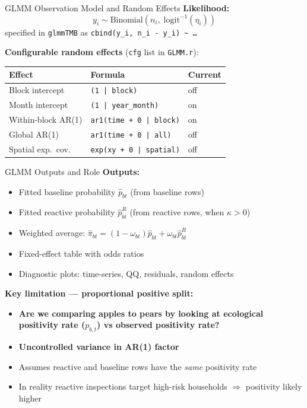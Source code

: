 \documentclass[aspectratio=169]{beamer}
\begin{document}
\begin{frame}{GLMM Observation Model and Random Effects}
  \textbf{Likelihood:}
  \begin{equation*}
    y_i \sim \text{Binomial}(n_i,\; \text{logit}^{-1}(\eta_i))
  \end{equation*}
  specified in \texttt{glmmTMB} as \texttt{cbind(y\_i, n\_i - y\_i) \textasciitilde\ \ldots}

  \vspace{0.5cm}
  \textbf{Configurable random effects} (\texttt{cfg} list in \texttt{GLMM.r}):
  \begin{center}
  \small
  \begin{tabular}{lll}
    \hline
    \textbf{Effect} & \textbf{Formula} & \textbf{Current} \\
    \hline
    Block intercept & \texttt{(1 | block)} & off \\
    Month intercept & \texttt{(1 | year\_month)} & on \\
    Within-block AR(1) & \texttt{ar1(time + 0 | block)} & on \\
    Global AR(1) & \texttt{ar1(time + 0 | all)} & off \\
    Spatial exp.\ cov. & \texttt{exp(xy + 0 | spatial)} & off \\
    \hline
  \end{tabular}
  \end{center}
\end{frame}

\begin{frame}{GLMM Outputs and Role}
  \textbf{Outputs:}
  \begin{itemize}
    \item Fitted baseline probability $\hat{p}_{bt}$ (from baseline rows)
    \item Fitted reactive probability $\hat{p}_{bt}^R$ (from reactive rows, when $\kappa > 0$)
    \item Weighted average: $\hat{\pi}_{bt} = (1-\omega_{bt})\hat{p}_{bt} + \omega_{bt}\hat{p}_{bt}^R$
    \item Fixed-effect table with odds ratios
    \item Diagnostic plots: time-series, QQ, residuals, random effects
  \end{itemize}

  \vspace{0.5cm}
  \textbf{Key limitation --- proportional positive split:}
  \begin{itemize}
    \item \textbf{Are we comparing apples to pears by looking at ecological positivity rate ($p_{b,t}$) vs observed positivity rate?}
    \item \textbf{Uncontrolled variance in AR(1) factor}
    \item Assumes reactive and baseline rows have the \emph{same} positivity rate
    \item In reality reactive inspections target high-risk households $\Rightarrow$ positivity likely higher
  \end{itemize}
\end{frame}
\end{document}
